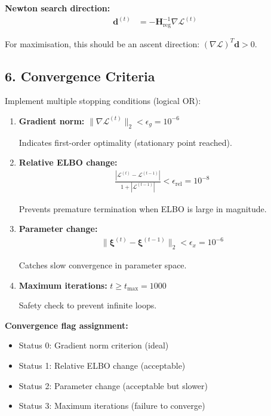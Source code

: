 \documentclass[11pt]{article}
\begin{document}
\textbf{Newton search direction:}
\begin{align}
\bm{d}^{(t)} &= -\bm{H}_{\text{reg}}^{-1} \nabla \mathcal{L}^{(t)}
\end{align}

For maximisation, this should be an ascent direction: $(\nabla \mathcal{L})^T \bm{d} > 0$.

\subsection*{6. Convergence Criteria}

Implement multiple stopping conditions (logical OR):

\begin{enumerate}
\item \textbf{Gradient norm:} $\|\nabla \mathcal{L}^{(t)}\|_2 < \epsilon_g = 10^{-6}$

Indicates first-order optimality (stationary point reached).

\item \textbf{Relative ELBO change:}
\begin{align}
\frac{|\mathcal{L}^{(t)} - \mathcal{L}^{(t-1)}|}{1 + |\mathcal{L}^{(t-1)}|} < \epsilon_{\text{rel}} = 10^{-8}
\end{align}

Prevents premature termination when ELBO is large in magnitude.

\item \textbf{Parameter change:}
\begin{align}
\|\bm{\xi}^{(t)} - \bm{\xi}^{(t-1)}\|_2 < \epsilon_x = 10^{-6}
\end{align}

Catches slow convergence in parameter space.

\item \textbf{Maximum iterations:} $t \geq t_{\max} = 1000$

Safety check to prevent infinite loops.
\end{enumerate}

\textbf{Convergence flag assignment:}
\begin{itemize}
\item Status 0: Gradient norm criterion (ideal)
\item Status 1: Relative ELBO change (acceptable)
\item Status 2: Parameter change (acceptable but slower)
\item Status 3: Maximum iterations (failure to converge)
\end{itemize}
\end{document}
